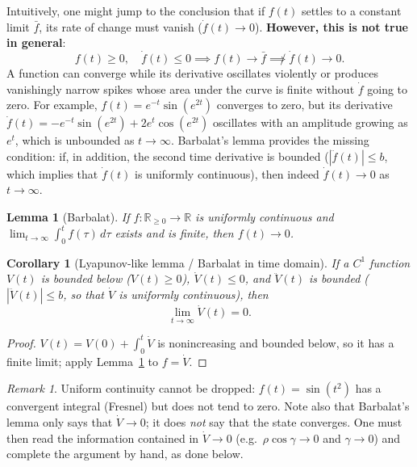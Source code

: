 \documentclass[11pt,a4paper]{article}
\newcommand{\R}{\mathbb{R}}
\theoremstyle{definition}
\theoremstyle{plain}
\newtheorem{lemma}[definition]{Lemma}
\newtheorem{corollary}[definition]{Corollary}
\theoremstyle{remark}
\newtheorem*{remark}{Remark}
\begin{document}
Intuitively, one might jump to the conclusion that if $f(t)$ settles to a constant limit $\bar f$, its rate of change must vanish ($\dot f(t)\to0$). \textbf{However, this is not true in general}:
\[
f(t)\ge0,\quad \dot f(t)\le0 \implies f(t)\to\bar f \not\implies \dot f(t)\to0 .
\]
A function can converge while its derivative oscillates violently or produces vanishingly narrow spikes whose area under the curve is finite without $\dot f$ going to zero. For example, $f(t)=e^{-t}\sin(e^{2t})$ converges to zero, but its derivative $\dot f(t)=-e^{-t}\sin(e^{2t})+2e^t\cos(e^{2t})$ oscillates with an amplitude growing as $e^t$, which is unbounded as $t\to\infty$.
Barbalat's lemma provides the missing condition: if, in addition, the second time derivative is bounded ($|\ddot f(t)|\le b$, which implies that $\dot f(t)$ is uniformly continuous), then indeed $\dot f(t)\to0$ as $t\to\infty$.

\begin{lemma}[Barbalat]\label{lem:barbalat}
If $f:\R_{\ge0}\to\R$ is uniformly continuous and $\lim_{t\to\infty}\int_0^tf(\tau)\,d\tau$ exists and is finite, then $f(t)\to0$.
\end{lemma}

\begin{corollary}[Lyapunov-like lemma / Barbalat in time domain]\label{cor:lyaplike}
If a $C^1$ function $V(t)$ is bounded below ($V(t)\ge0$), $\dot V(t)\le0$, and $\ddot V(t)$ is bounded ($|\ddot V(t)|\le b$, so that $\dot V$ is uniformly continuous), then
\[
\lim_{t\to\infty}\dot V(t)=0 .
\]
\end{corollary}

\begin{proof}
$V(t)=V(0)+\int_0^t\dot V$ is nonincreasing and bounded below, so it has a finite limit; apply Lemma~\ref{lem:barbalat} to $f=\dot V$.
\end{proof}

\begin{remark}
Uniform continuity cannot be dropped: $f(t)=\sin(t^2)$ has a convergent integral (Fresnel) but does not tend to zero. Note also that Barbalat's lemma only says that $\dot V\to0$; it does \emph{not} say that the state converges. One must then read the information contained in $\dot V\to0$ (e.g.\ $\rho\cos\gamma\to0$ and $\gamma\to0$) and complete the argument by hand, as done below.
\end{remark}
\end{document}
